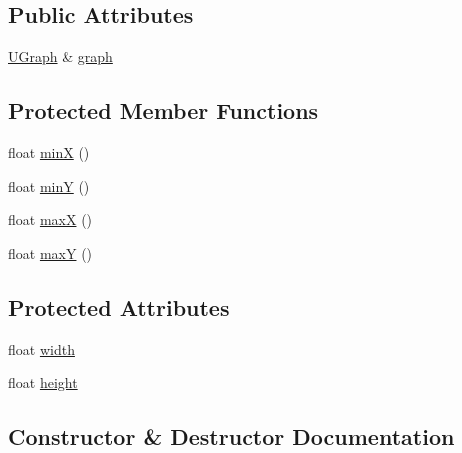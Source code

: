 \subsection*{Public Attributes}
\begin{DoxyCompactItemize}
\item 
\mbox{\hyperlink{classRPGraph_1_1UGraph}{U\+Graph}} \& \mbox{\hyperlink{classRPGraph_1_1GraphLayout_af44bb2c10eee4ef67c95355ce93432a5}{graph}}
\end{DoxyCompactItemize}
\subsection*{Protected Member Functions}
\begin{DoxyCompactItemize}
\item 
float \mbox{\hyperlink{classRPGraph_1_1GraphLayout_a9b538f82aabafa2d2f0e1a08edcf9b85}{minX}} ()
\item 
float \mbox{\hyperlink{classRPGraph_1_1GraphLayout_adc5cd076f816ecca32c91c4fe3a2a57e}{minY}} ()
\item 
float \mbox{\hyperlink{classRPGraph_1_1GraphLayout_a6ec496912efecaa34efd4de6d88fc505}{maxX}} ()
\item 
float \mbox{\hyperlink{classRPGraph_1_1GraphLayout_a031dd59e25111ed175d6153d2cb44f9a}{maxY}} ()
\end{DoxyCompactItemize}
\subsection*{Protected Attributes}
\begin{DoxyCompactItemize}
\item 
float \mbox{\hyperlink{classRPGraph_1_1GraphLayout_ade29dd5ff17faff96348650a99bd120c}{width}}
\item 
float \mbox{\hyperlink{classRPGraph_1_1GraphLayout_a86a79a0329c88ef7cef8d57fce9f0e1b}{height}}
\end{DoxyCompactItemize}


\subsection{Constructor \& Destructor Documentation}
\mbox{\label{classRPGraph_1_1GraphLayout_a3d1840f5ef30c9c7a6ce5d41b54230ef}} 
